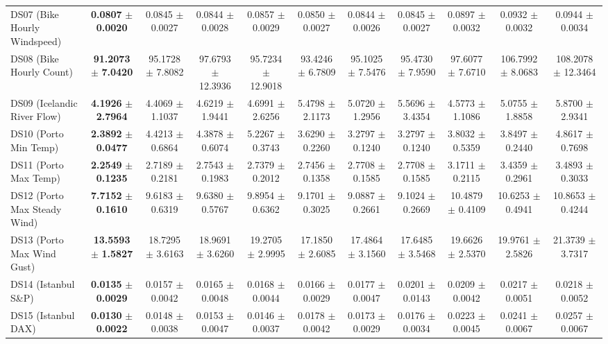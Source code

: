 \begin{table}[t]
{{\begin{tabular}{lcccccccccc}
DS07 (Bike Hourly Windspeed) & \textbf{0.0807} $\pm$ \textbf{0.0020} & 0.0845 $\pm$ 0.0027 & 0.0844 $\pm$ 0.0028 & 0.0857 $\pm$ 0.0029 & 0.0850 $\pm$ 0.0027 & 0.0844 $\pm$ 0.0026 & 0.0845 $\pm$ 0.0027 & 0.0897 $\pm$ 0.0032 & 0.0932 $\pm$ 0.0032 & 0.0944 $\pm$ 0.0034 \\
DS08 (Bike Hourly Count) & \textbf{91.2073} $\pm$ \textbf{7.0420} & 95.1728 $\pm$ 7.8082 & 97.6793 $\pm$ 12.3936 & 95.7234 $\pm$ 12.9018 & 93.4246 $\pm$ 6.7809 & 95.1025 $\pm$ 7.5476 & 95.4730 $\pm$ 7.9590 & 97.6077 $\pm$ 7.6710 & 106.7992 $\pm$ 8.0683 & 108.2078 $\pm$ 12.3464 \\
DS09 (Icelandic River Flow) & \textbf{4.1926} $\pm$ \textbf{2.7964} & 4.4069 $\pm$ 1.1037 & 4.6219 $\pm$ 1.9441 & 4.6991 $\pm$ 2.6256 & 5.4798 $\pm$ 2.1173 & 5.0720 $\pm$ 1.2956 & 5.5696 $\pm$ 3.4354 & 4.5773 $\pm$ 1.1086 & 5.0755 $\pm$ 1.8858 & 5.8700 $\pm$ 2.9341 \\
DS10 (Porto Min Temp) & \textbf{2.3892} $\pm$ \textbf{0.0477} & 4.4213 $\pm$ 0.6864 & 4.3878 $\pm$ 0.6074 & 5.2267 $\pm$ 0.3743 & 3.6290 $\pm$ 0.2260 & 3.2797 $\pm$ 0.1240 & 3.2797 $\pm$ 0.1240 & 3.8032 $\pm$ 0.5359 & 3.8497 $\pm$ 0.2440 & 4.8617 $\pm$ 0.7698 \\
DS11 (Porto Max Temp) & \textbf{2.2549} $\pm$ \textbf{0.1235} & 2.7189 $\pm$ 0.2181 & 2.7543 $\pm$ 0.1983 & 2.7379 $\pm$ 0.2012 & 2.7456 $\pm$ 0.1358 & 2.7708 $\pm$ 0.1585 & 2.7708 $\pm$ 0.1585 & 3.1711 $\pm$ 0.2115 & 3.4359 $\pm$ 0.2961 & 3.4893 $\pm$ 0.3033 \\
DS12 (Porto Max Steady Wind) & \textbf{7.7152} $\pm$ \textbf{0.1610} & 9.6183 $\pm$ 0.6319 & 9.6380 $\pm$ 0.5767 & 9.8954 $\pm$ 0.6362 & 9.1701 $\pm$ 0.3025 & 9.0887 $\pm$ 0.2661 & 9.1024 $\pm$ 0.2669 & 10.4879 $\pm$ 0.4109 & 10.6253 $\pm$ 0.4941 & 10.8653 $\pm$ 0.4244 \\
DS13 (Porto Max Wind Gust) & \textbf{13.5593} $\pm$ \textbf{1.5827} & 18.7295 $\pm$ 3.6163 & 18.9691 $\pm$ 3.6260 & 19.2705 $\pm$ 2.9995 & 17.1850 $\pm$ 2.6085 & 17.4864 $\pm$ 3.1560 & 17.6485 $\pm$ 3.5468 & 19.6626 $\pm$ 2.5370 & 19.9761 $\pm$ 2.5826 & 21.3739 $\pm$ 3.7317 \\
DS14 (Istanbul S\&P) & \textbf{0.0135} $\pm$ \textbf{0.0029} & 0.0157 $\pm$ 0.0042 & 0.0165 $\pm$ 0.0048 & 0.0168 $\pm$ 0.0044 & 0.0166 $\pm$ 0.0029 & 0.0177 $\pm$ 0.0047 & 0.0201 $\pm$ 0.0143 & 0.0209 $\pm$ 0.0042 & 0.0217 $\pm$ 0.0051 & 0.0218 $\pm$ 0.0052 \\
DS15 (Istanbul DAX) & \textbf{0.0130} $\pm$ \textbf{0.0022} & 0.0148 $\pm$ 0.0038 & 0.0153 $\pm$ 0.0047 & 0.0146 $\pm$ 0.0037 & 0.0178 $\pm$ 0.0042 & 0.0173 $\pm$ 0.0029 & 0.0176 $\pm$ 0.0034 & 0.0223 $\pm$ 0.0045 & 0.0241 $\pm$ 0.0067 & 0.0257 $\pm$ 0.0067 \\

\end{tabular}}}
\end{table}
